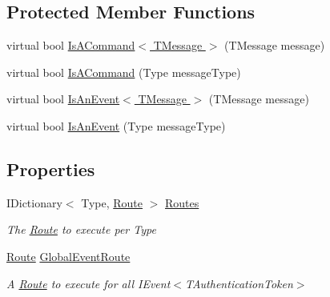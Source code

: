 \subsection*{Protected Member Functions}
\begin{DoxyCompactItemize}
\item 
virtual bool \hyperlink{classCqrs_1_1Bus_1_1RouteManager_a1ee8d583bb5d75a54cdac03c8e84b8d9_a1ee8d583bb5d75a54cdac03c8e84b8d9}{Is\+A\+Command$<$ T\+Message $>$} (T\+Message message)
\item 
virtual bool \hyperlink{classCqrs_1_1Bus_1_1RouteManager_a7b7bfc4db30cc5956c4acd6a342e9159_a7b7bfc4db30cc5956c4acd6a342e9159}{Is\+A\+Command} (Type message\+Type)
\item 
virtual bool \hyperlink{classCqrs_1_1Bus_1_1RouteManager_a7e5099741cd4b3e538599c771581a4b6_a7e5099741cd4b3e538599c771581a4b6}{Is\+An\+Event$<$ T\+Message $>$} (T\+Message message)
\item 
virtual bool \hyperlink{classCqrs_1_1Bus_1_1RouteManager_a7b9b2ad8b9f5d7761b0f45c033b96101_a7b9b2ad8b9f5d7761b0f45c033b96101}{Is\+An\+Event} (Type message\+Type)
\end{DoxyCompactItemize}
\subsection*{Properties}
\begin{DoxyCompactItemize}
\item 
I\+Dictionary$<$ Type, \hyperlink{classCqrs_1_1Bus_1_1Route}{Route} $>$ \hyperlink{classCqrs_1_1Bus_1_1RouteManager_ad6a3c8e41e10f62d075e52d08d817cee_ad6a3c8e41e10f62d075e52d08d817cee}{Routes}
\begin{DoxyCompactList}\small\item\em The \hyperlink{classCqrs_1_1Bus_1_1Route}{Route} to execute per Type \end{DoxyCompactList}\item 
\hyperlink{classCqrs_1_1Bus_1_1Route}{Route} \hyperlink{classCqrs_1_1Bus_1_1RouteManager_a083b3775e28b500eca7351c9990e15a3_a083b3775e28b500eca7351c9990e15a3}{Global\+Event\+Route}
\begin{DoxyCompactList}\small\item\em A \hyperlink{classCqrs_1_1Bus_1_1Route}{Route} to execute for all I\+Event$<$\+T\+Authentication\+Token$>$ \end{DoxyCompactList}\end{DoxyCompactItemize}


